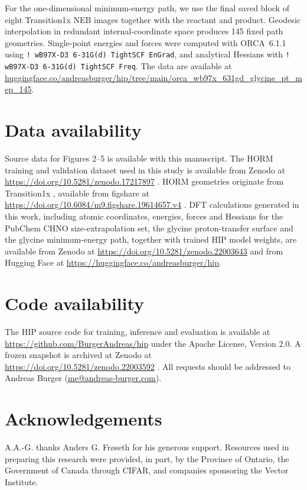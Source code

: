 \documentclass[pdflatex,sn-mathphys-num]{sn-jnl}%
\begin{document}
For the one-dimensional minimum-energy path, we use the final saved block of eight Transition1x NEB images together with the reactant and product. Geodesic interpolation in redundant internal-coordinate space produces 145 fixed path geometries. Single-point energies and forces were computed with ORCA~6.1.1 using \texttt{! wB97X-D3 6-31G(d) TightSCF EnGrad}, and analytical Hessians with \texttt{! wB97X-D3 6-31G(d) TightSCF Freq}. The data are available at \url{huggingface.co/andreasburger/hip/tree/main/orca_wb97x_631gd_glycine_pt_mep_145}.



\backmatter

\section{Data availability}
Source data for Figures 2--5 is available with this manuscript.
The HORM training and validation dataset used in this study is available from Zenodo at \url{https://doi.org/10.5281/zenodo.17217897} \citep{horm_zenodo,cui2025horm}.
HORM geometries originate from Transition1x \citep{schreiner2022transition1x}, available from figshare at \url{https://doi.org/10.6084/m9.figshare.19614657.v4} \citep{transition1x_figshare}.
DFT calculations generated in this work, including atomic coordinates, energies, forces and Hessians for the PubChem CHNO size-extrapolation set, the glycine proton-transfer surface and the glycine minimum-energy path, together with trained HIP model weights, are available from Zenodo at \url{https://doi.org/10.5281/zenodo.22003643} \citep{hip_zenodo_data} and from Hugging Face at \url{https://huggingface.co/andreasburger/hip}.

\section{Code availability}
The HIP source code for training, inference and evaluation is available at \url{https://github.com/BurgerAndreas/hip} under the Apache License, Version 2.0.
A frozen snapshot is archived at Zenodo at \url{https://doi.org/10.5281/zenodo.22003592} \citep{hip_zenodo_code}.
All requests should be addressed to Andreas Burger (\url{me@andreas-burger.com}).

\section{Acknowledgements}
A.A.-G. thanks Anders G. Frøseth for his generous support.
Resources used in preparing this research were provided, in part, by the Province of Ontario, the Government of Canada through CIFAR, and companies sponsoring the Vector Institute.
\end{document}
